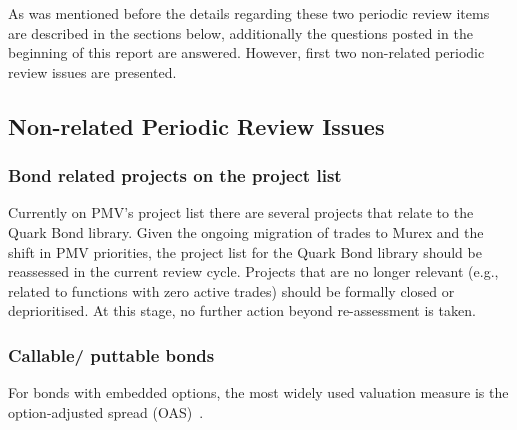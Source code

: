 \documentclass[reviewdoc]{pmv_report}  %
\begin{document}
\begin{enumerate}
\begin{itemize}
  \end{itemize}
\end{enumerate}

As was mentioned before the details regarding these two periodic review items are described in the sections below, additionally the questions posted in the beginning of this report are answered.
However, first two non-related periodic review issues are presented.

\subsection{Non-related Periodic Review Issues}

\subsubsection{Bond related projects on the project list}


Currently on PMV's project list there are several projects that relate to the Quark Bond library.
Given the ongoing migration of trades to Murex and the shift in PMV priorities, the project list for the Quark Bond library should be reassessed in the current review cycle.
Projects that are no longer relevant (e.g., related to functions with zero active trades) should be formally closed or deprioritised.
At this stage, no further action beyond re-assessment is taken.

\subsubsection{Callable/ puttable bonds}

For bonds with embedded options, the most widely used valuation measure is the option-adjusted spread (OAS)~\cite{Hayre04}.
\end{document}

